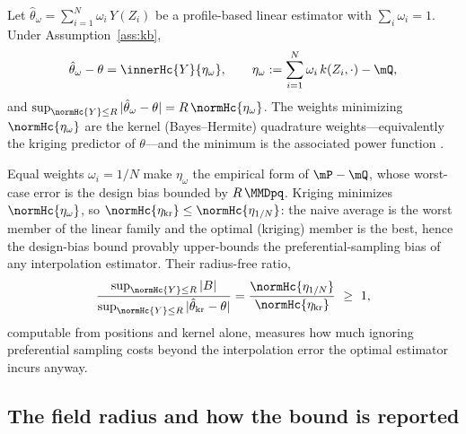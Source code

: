 \begin{proposition}
\label{prop:kb-estimator}
Let $\hat\theta_\omega=\sum_{i=1}^{N}\omega_i\,Y(Z_i)$ be a profile-based linear
estimator with $\sum_i\omega_i=1$. Under Assumption~\ref{ass:kb},
\[
  \hat\theta_\omega-\theta=\innerHc{Y}{\eta_\omega},
  \qquad
  \eta_\omega:=\sum_{i=1}^{N}\omega_i\,k(Z_i,\cdot)-\mQ,
\]
and $\sup_{\normHc{Y}\le R}|\hat\theta_\omega-\theta|=R\,\normHc{\eta_\omega}$. The
weights minimizing $\normHc{\eta_\omega}$ are the kernel (Bayes--Hermite) quadrature
weights---equivalently the kriging predictor of $\theta$---and the minimum is the
associated power function \citep{ohagan1991,micchelli1977,donoho1994}.
\end{proposition}

Equal weights $\omega_i=1/N$ make $\eta_\omega$ the empirical form of $\mP-\mQ$,
whose worst-case error is the design bias bounded by $R\,\MMDpq$. Kriging minimizes
$\normHc{\eta_\omega}$, so $\normHc{\eta_{\mathrm{kr}}}\le\normHc{\eta_{1/N}}$: the
naive average is the worst member of the linear family and the optimal (kriging)
member is the best, hence the design-bias bound provably upper-bounds the
preferential-sampling bias of any interpolation estimator. Their radius-free ratio,
\[
  \frac{\sup_{\normHc{Y}\le R}|B|}{\sup_{\normHc{Y}\le R}|\hat\theta_{\mathrm{kr}}-\theta|}
  =\frac{\normHc{\eta_{1/N}}}{\normHc{\eta_{\mathrm{kr}}}}\ \ge\ 1 ,
\]
computable from positions and kernel alone, measures how much ignoring preferential
sampling costs beyond the interpolation error the optimal estimator incurs anyway.

\subsection{The field radius and how the bound is reported}
\label{sec:kb-radius}

